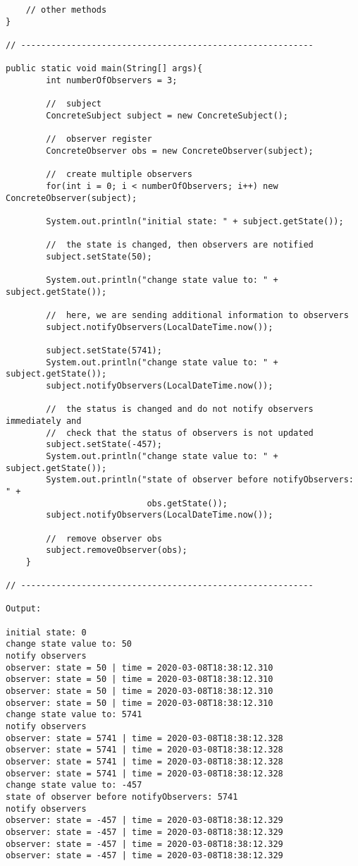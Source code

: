 \begin{verbatim}
    // other methods
}

// ----------------------------------------------------------

public static void main(String[] args){
        int numberOfObservers = 3;

        //  subject
        ConcreteSubject subject = new ConcreteSubject();
        
        //  observer register
        ConcreteObserver obs = new ConcreteObserver(subject);

        //  create multiple observers
        for(int i = 0; i < numberOfObservers; i++) new ConcreteObserver(subject);

        System.out.println("initial state: " + subject.getState());

        //  the state is changed, then observers are notified
        subject.setState(50);

        System.out.println("change state value to: " + subject.getState());

        //  here, we are sending additional information to observers
        subject.notifyObservers(LocalDateTime.now());

        subject.setState(5741);
        System.out.println("change state value to: " + subject.getState());
        subject.notifyObservers(LocalDateTime.now());
        
        //  the status is changed and do not notify observers immediately and 
        //  check that the status of observers is not updated
        subject.setState(-457);
        System.out.println("change state value to: " + subject.getState());
        System.out.println("state of observer before notifyObservers: " +
                            obs.getState());
        subject.notifyObservers(LocalDateTime.now());

        //  remove observer obs
        subject.removeObserver(obs);
    }

// ----------------------------------------------------------

Output:

initial state: 0
change state value to: 50
notify observers
observer: state = 50 | time = 2020-03-08T18:38:12.310
observer: state = 50 | time = 2020-03-08T18:38:12.310
observer: state = 50 | time = 2020-03-08T18:38:12.310
observer: state = 50 | time = 2020-03-08T18:38:12.310
change state value to: 5741
notify observers
observer: state = 5741 | time = 2020-03-08T18:38:12.328
observer: state = 5741 | time = 2020-03-08T18:38:12.328
observer: state = 5741 | time = 2020-03-08T18:38:12.328
observer: state = 5741 | time = 2020-03-08T18:38:12.328
change state value to: -457
state of observer before notifyObservers: 5741
notify observers
observer: state = -457 | time = 2020-03-08T18:38:12.329
observer: state = -457 | time = 2020-03-08T18:38:12.329
observer: state = -457 | time = 2020-03-08T18:38:12.329
observer: state = -457 | time = 2020-03-08T18:38:12.329
\end{verbatim}

\appendix